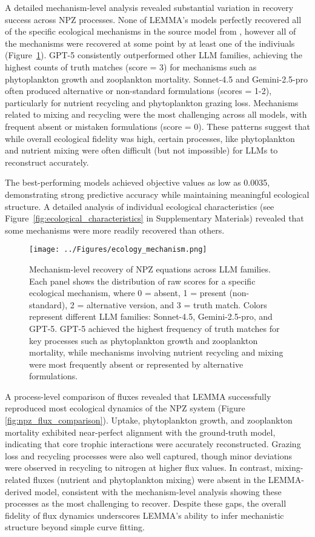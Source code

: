 A detailed mechanism-level analysis revealed substantial variation in recovery success across NPZ processes. None of LEMMA's models perfectly recovered all of the specific ecological mechanisms in the source model from \cite{edwards1999zooplankton}, however all of the mechanisms were recovered at some point by at least one of the indiviuals (Figure~\ref{fig:mechanism_recovery}). GPT-5 consistently outperformed other LLM families, achieving the highest counts of truth matches (score = 3) for mechanisms such as phytoplankton growth and zooplankton mortality. Sonnet-4.5 and Gemini-2.5-pro often produced alternative or non-standard formulations (scores = 1-2), particularly for nutrient recycling and phytoplankton grazing loss. Mechanisms related to mixing and recycling were the most challenging across all models, with frequent absent or mistaken formulations (score = 0). These patterns suggest that while overall ecological fidelity was high, certain processes, like phytoplankton and nutrient mixing were often difficult (but not impossible) for LLMs to reconstruct accurately.

The best-performing models achieved objective values as low as 0.0035, demonstrating strong predictive accuracy while maintaining meaningful ecological structure. A detailed analysis of individual ecological characteristics (see Figure~\ref{fig:ecological_characteristics} in Supplementary Materials) revealed that some mechanisms were more readily recovered than others.

\begin{figure}[H]
\centering
\texttt{[image: ../Figures/ecology\_mechanism.png]}
\caption{Mechanism-level recovery of NPZ equations across LLM families. Each panel shows the distribution of raw scores for a specific ecological mechanism, where 0 = absent, 1 = present (non-standard), 2 = alternative version, and 3 = truth match. Colors represent different LLM families: Sonnet-4.5, Gemini-2.5-pro, and GPT-5. GPT-5 achieved the highest frequency of truth matches for key processes such as phytoplankton growth and zooplankton mortality, while mechanisms involving nutrient recycling and mixing were most frequently absent or represented by alternative formulations.}
\label{fig:mechanism_recovery}
\end{figure}

A process-level comparison of fluxes revealed that LEMMA successfully reproduced most ecological dynamics of the NPZ system (Figure \ref{fig:npz_flux_comparison}). Uptake, phytoplankton growth, and zooplankton mortality exhibited near-perfect alignment with the ground-truth model, indicating that core trophic interactions were accurately reconstructed. Grazing loss and recycling processes were also well captured, though minor deviations were observed in recycling to nitrogen at higher flux values. In contrast, mixing-related fluxes (nutrient and phytoplankton mixing) were absent in the LEMMA-derived model, consistent with the mechanism-level analysis showing these processes as the most challenging to recover. Despite these gaps, the overall fidelity of flux dynamics underscores LEMMA's ability to infer mechanistic structure beyond simple curve fitting.

